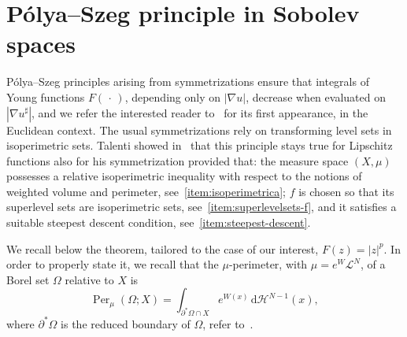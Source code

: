 \documentclass[a4paper,12pt,reqno]{amsart}
\numberwithin{equation}{section}
\renewcommand{\H}{\mathcal{H}}
\DeclareMathOperator{\Per}{Per}
\theoremstyle{plain}
\theoremstyle{definition}
\begin{document}
\section{\texorpdfstring{P\'olya--Szeg\H{o}}{Polya--Szego} principle in Sobolev spaces}
\label{sec:polya-szego}

P\'olya--Szeg\H{o} principles arising from symmetrizations ensure that integrals of Young functions $F(\,\cdot\,)$, depending only on $|\nabla u|$, decrease when evaluated on $|\nabla u^\sharp|$, and we refer the interested reader to~\cite{PS51book} for its first appearance, in the Euclidean context. The usual symmetrizations rely on transforming level sets in isoperimetric sets. Talenti showed in~\cite{Tal97} that this principle stays true for Lipschitz functions also for his symmetrization provided that: the measure space  $(X,\mu)$ possesses a relative isoperimetric inequality with respect to the notions of weighted volume and perimeter, see~\ref{item:isoperimetrica}; $f$ is chosen so that its superlevel sets are isoperimetric sets, see~\ref{item:superlevelsets-f}, and it satisfies a suitable steepest descent condition, see~\ref{item:steepest-descent}. 

We recall below the theorem, tailored to the case of our interest, $F(z) = |z|^p$. 
In order to properly state it, we recall that the $\mu$-perimeter, with $\mu=e^W\mathcal{L}^N$, of a Borel set $\Omega$ relative to $X$ is
%
\begin{equation}
\label{eq:P-mu}
\Per_\mu(\Omega; X) = \int_{\partial^* \Omega \cap X} e^{W(x)}\,\mathrm{d}\mathcal{H}^{N-1}(x),
\end{equation}
%
where $\partial^*\Omega$ is the reduced boundary of $\Omega$, refer to~\cite{Mag12book}.
\end{document}
